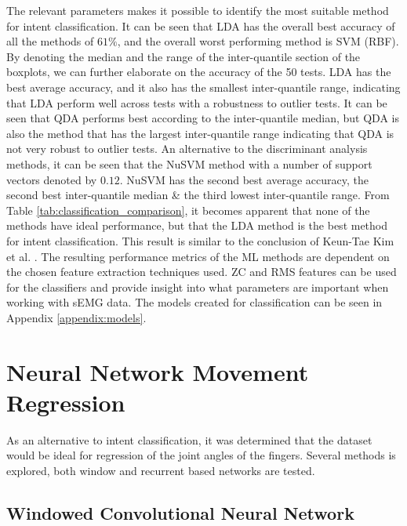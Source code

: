 \documentclass[../main.tex]{subfiles}
\begin{document}
The relevant parameters makes it possible to identify the most suitable method for intent classification.
It can be seen that LDA has the overall best accuracy of all the methods of $61\%$, and the overall worst performing method is SVM (RBF).
By denoting the median and the range of the inter-quantile section of the boxplots, we can further elaborate on the accuracy of the 50 tests.
LDA has the best average accuracy, and it also has the smallest inter-quantile range, indicating that LDA perform well across tests with a robustness to outlier tests. 
It can be seen that QDA performs best according to the inter-quantile median, but QDA is also the method that has the largest inter-quantile range indicating that QDA is not very robust to outlier tests.
An alternative to the discriminant analysis methods, it can be seen that the NuSVM method with a number of support vectors denoted by $0.12$.
NuSVM has the second best average accuracy, the second best inter-quantile median \& the third lowest inter-quantile range.
From Table \ref{tab:classification_comparison}, it becomes apparent that none of the methods have ideal performance, but that the LDA method is the best method for intent classification.
This result is similar to the conclusion of Keun-Tae Kim et al. \cite{KeunTaeKim2021}.
The resulting performance metrics of the ML methods are dependent on the chosen feature extraction techniques used.
\gls{ZC} and \gls{RMS} features can be used for the classifiers and provide insight into what parameters are important when working with sEMG data.
The models created for classification can be seen in Appendix \ref{appendix:models}.

\section{Neural Network Movement Regression}
\label{sec:regression}

As an alternative to intent classification, it was determined that the dataset would be ideal for regression of the joint angles of the fingers.
Several methods is explored, both window and recurrent based networks are tested.


\subsection{Windowed Convolutional Neural Network}
\end{document}
